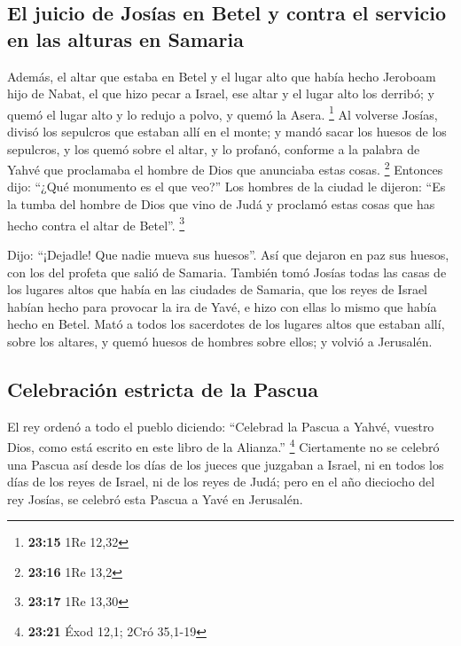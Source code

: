 \hypertarget{el-juicio-de-josuxedas-en-betel-y-contra-el-servicio-en-las-alturas-en-samaria}{%
\subsection{El juicio de Josías en Betel y contra el servicio en las
alturas en
Samaria}\label{el-juicio-de-josuxedas-en-betel-y-contra-el-servicio-en-las-alturas-en-samaria}}

 Además, el altar que estaba en Betel y el lugar alto que
había hecho Jeroboam hijo de Nabat, el que hizo pecar a Israel, ese
altar y el lugar alto los derribó; y quemó el lugar alto y lo redujo a
polvo, y quemó la Asera. \footnote{\textbf{23:15} 1Re 12,32}
 Al volverse Josías, divisó los sepulcros que estaban
allí en el monte; y mandó sacar los huesos de los sepulcros, y los quemó
sobre el altar, y lo profanó, conforme a la palabra de Yahvé que
proclamaba el hombre de Dios que anunciaba estas cosas. \footnote{\textbf{23:16}
  1Re 13,2}  Entonces dijo: ``¿Qué monumento es el que
veo?'' Los hombres de la ciudad le dijeron: ``Es la tumba del hombre de
Dios que vino de Judá y proclamó estas cosas que has hecho contra el
altar de Betel''. \footnote{\textbf{23:17} 1Re 13,30}

 Dijo: ``¡Dejadle! Que nadie mueva sus huesos''. Así que
dejaron en paz sus huesos, con los del profeta que salió de Samaria.
 También tomó Josías todas las casas de los lugares altos
que había en las ciudades de Samaria, que los reyes de Israel habían
hecho para provocar la ira de Yavé, e hizo con ellas lo mismo que había
hecho en Betel.  Mató a todos los sacerdotes de los
lugares altos que estaban allí, sobre los altares, y quemó huesos de
hombres sobre ellos; y volvió a Jerusalén.

\hypertarget{celebraciuxf3n-estricta-de-la-pascua}{%
\subsection{Celebración estricta de la
Pascua}\label{celebraciuxf3n-estricta-de-la-pascua}}

 El rey ordenó a todo el pueblo diciendo: ``Celebrad la
Pascua a Yahvé, vuestro Dios, como está escrito en este libro de la
Alianza.'' \footnote{\textbf{23:21} Éxod 12,1; 2Cró 35,1-19}
 Ciertamente no se celebró una Pascua así desde los días
de los jueces que juzgaban a Israel, ni en todos los días de los reyes
de Israel, ni de los reyes de Judá;  pero en el año
dieciocho del rey Josías, se celebró esta Pascua a Yavé en Jerusalén.


